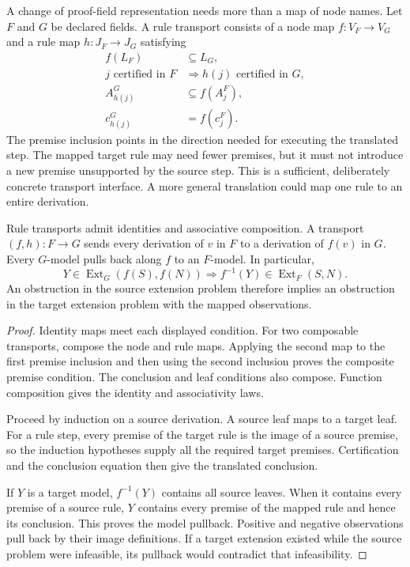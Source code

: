 A change of proof-field representation needs more than a map of node names. Let $F$ and $G$ be declared fields. A rule transport consists of a node map $f:V_F\to V_G$ and a rule map $h:J_F\to J_G$ satisfying
\[
\begin{aligned}
 f(L_F)&\subseteq L_G,\\
 j\text{ certified in }F&\Longrightarrow h(j)\text{ certified in }G,\\
 A^G_{h(j)}&\subseteq f(A^F_j),\\
 c^G_{h(j)}&=f(c^F_j).
\end{aligned}
\]
The premise inclusion points in the direction needed for executing the translated step. The mapped target rule may need fewer premises, but it must not introduce a new premise unsupported by the source step. This is a sufficient, deliberately concrete transport interface. A more general translation could map one rule to an entire derivation.

\begin{theorem}
\label{res:new:transport}
Rule transports admit identities and associative composition. A transport $(f,h):F\to G$ sends every derivation of $v$ in $F$ to a derivation of $f(v)$ in $G$. Every $G$-model pulls back along $f$ to an $F$-model. In particular,
\[
 Y\in\operatorname{Ext}_G(f(S),f(N))
   \Longrightarrow f^{-1}(Y)\in\operatorname{Ext}_F(S,N).
\]
An obstruction in the source extension problem therefore implies an obstruction in the target extension problem with the mapped observations.
\end{theorem}
\begin{proof}
Identity maps meet each displayed condition. For two composable transports, compose the node and rule maps. Applying the second map to the first premise inclusion and then using the second inclusion proves the composite premise condition. The conclusion and leaf conditions also compose. Function composition gives the identity and associativity laws.

Proceed by induction on a source derivation. A source leaf maps to a target leaf. For a rule step, every premise of the target rule is the image of a source premise, so the induction hypotheses supply all the required target premises. Certification and the conclusion equation then give the translated conclusion.

If $Y$ is a target model, $f^{-1}(Y)$ contains all source leaves. When it contains every premise of a source rule, $Y$ contains every premise of the mapped rule and hence its conclusion. This proves the model pullback. Positive and negative observations pull back by their image definitions. If a target extension existed while the source problem were infeasible, its pullback would contradict that infeasibility.
\end{proof}

